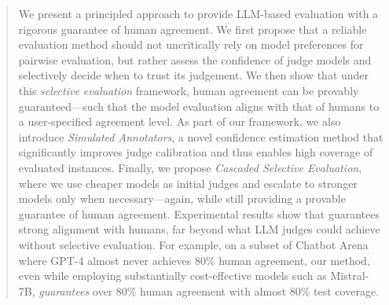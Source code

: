 \begin{abstract}
We present a principled approach to provide LLM-based evaluation with a rigorous guarantee of human agreement. We first propose that a reliable evaluation method should not uncritically rely on model preferences for pairwise evaluation, but rather assess the confidence of judge models and selectively decide when to trust its judgement. We then show that under this \textit{selective evaluation} framework, human agreement can be provably guaranteed---such that the model evaluation aligns with that of humans to a user-specified agreement level. As part of our framework, we also introduce \textit{Simulated Annotators}, a novel confidence estimation method that significantly improves judge calibration and thus enables high coverage of evaluated instances. Finally, we propose \textit{Cascaded Selective Evaluation}, where we use cheaper models as initial judges and escalate to stronger models only when necessary---again, while still providing a provable guarantee of human agreement. Experimental results show that \emph{\method} guarantees strong alignment with humans, far beyond what LLM judges could achieve without selective evaluation. For example, on a subset of Chatbot Arena where GPT-4 almost never achieves 80\% human agreement, our method, even while employing substantially cost-effective models such as Mistral-7B, \textit{guarantees} over 80\% human agreement with almost 80\% test coverage. \href{https://github.com/jaehunjung1/cascaded-selective-evaluation}{\faGithub}

\end{abstract}

